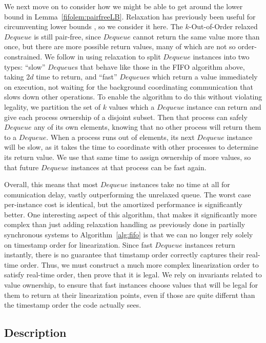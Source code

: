 \documentclass[a4paper,anonymous,USenglish]{lipics-v2021} %
\theoremstyle{definition}
\begin{document}
We next move on to consider how we might be able to get around the lower bound in Lemma~\ref{fifolem:pairfreeLB}.  Relaxation has previously been useful for circumventing lower bounds \cite{TalmageWelch14}, so we consider it here.  The $k$-Out-of-Order relaxed $Dequeue$ is still pair-free, since $Dequeue$ cannot return the same value more than once, but there are more possible return values, many of which are not so order-constrained.  We follow \cite{TalmageWelch14} in using relaxation to split $Dequeue$ instances into two types: ``slow'' $Dequeue$s that behave like those in the FIFO algorithm above, taking $2d$ time to return, and ``fast'' $Dequeue$s which return a value immediately on execution, not waiting for the background coordinating communication that slows down other operations.  To enable the algorithm to do this without violating legality, we partition the set of $k$ values which a $Dequeue$ instance can return and give each process ownership of a disjoint subset.  Then that process can safely $Dequeue$ any of its own elements, knowing that no other process will return them to a $Dequeue$.  When a process runs out of elements, its next $Dequeue$ instance will be slow, as it takes the time to coordinate with other processes to determine its return value.  We use that same time to assign ownership of more values, so that future $Dequeue$ instances at that process can be fast again.

Overall, this means that most $Dequeue$ instances take no time at all for comunication delay, vastly outperforming the unrelaxed queue.  The worst case per-instance cost is identical, but the amortized performance is significantly better.  One interesting aspect of this algorithm, that makes it significantly more complex than just adding relaxation handling as previously done in partially synchronous systems to Algorithm~\ref{alg:fifo} is that we can no longer rely solely on timestamp order for linearization.  Since fast $Dequeue$ instances return instantly, there is no guarantee that timstamp order correctly captures their real-time order.  Thus, we must construct a much more complex linearization order to satisfy real-time order, then prove that it is legal.  We rely on invariants related to value ownership, to ensure that fast instances choose values that will be legal for them to return at their linearization points, even if those are quite differnt than the timestamp order the code actually sees. 

\subsection{Description}
\end{document}
